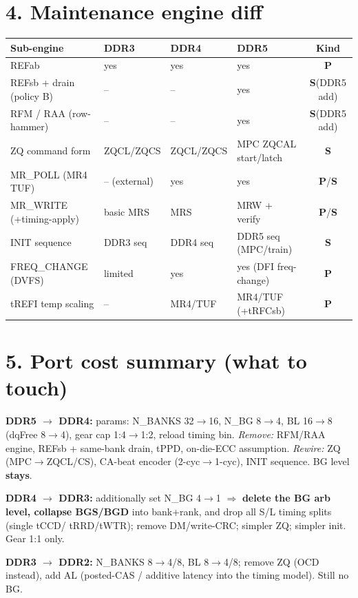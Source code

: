 \documentclass[10pt]{article}
\renewcommand{\P}{\textbf{\textcolor{para}{P}}}
\newcommand{\Su}{\textbf{\textcolor{stru}{S}}}
\begin{document}
\section*{4. Maintenance engine diff}
{\footnotesize
\begin{longtable}{>{\raggedright\arraybackslash}p{3.4cm} p{2.2cm} p{2.2cm} p{2.6cm} c}
\toprule
\textbf{Sub-engine} & \textbf{DDR3} & \textbf{DDR4} & \textbf{DDR5} & \textbf{Kind}\\
\midrule\endhead
REFab              & yes          & yes         & yes           & \P\\
REFsb + drain (policy B) & --     & --          & yes           & \Su (DDR5 add)\\
RFM / RAA (row-hammer) & --       & --          & yes           & \Su (DDR5 add)\\
ZQ command form    & ZQCL/ZQCS    & ZQCL/ZQCS   & MPC ZQCAL start/latch & \Su\\
MR\_POLL (MR4 TUF) & -- (external) & yes        & yes           & \P/\Su\\
MR\_WRITE (+timing-apply) & basic MRS & MRS     & MRW + verify  & \P/\Su\\
INIT sequence      & DDR3 seq     & DDR4 seq    & DDR5 seq (MPC/train) & \Su\\
FREQ\_CHANGE (DVFS) & limited     & yes         & yes (DFI freq-change)  & \P\\
tREFI temp scaling & --           & MR4/TUF     & MR4/TUF (+tRFCsb) & \P\\
\bottomrule
\end{longtable}}

\section*{5. Port cost summary (what to touch)}
\textbf{DDR5 $\rightarrow$ DDR4:} params: N\_BANKS 32$\to$16, N\_BG 8$\to$4, BL 16$\to$8
(dqFree 8$\to$4), gear cap 1:4$\to$1:2, reload timing bin. \emph{Remove:} RFM/RAA engine,
REFsb + same-bank drain, tPPD, on-die-ECC assumption. \emph{Rewire:} ZQ (MPC$\to$ZQCL/CS),
CA-beat encoder (2-cyc$\to$1-cyc), INIT sequence. BG level \textbf{stays}.

\textbf{DDR4 $\rightarrow$ DDR3:} additionally set N\_BG 4$\to$1 $\Rightarrow$ \textbf{delete the
BG arb level, collapse BGS/BGD} into bank+rank, and drop all S/L timing splits (single tCCD/
tRRD/tWTR); remove DM/write-CRC; simpler ZQ; simpler init. Gear 1:1 only.

\textbf{DDR3 $\rightarrow$ DDR2:} N\_BANKS 8$\to$4/8, BL 8$\to$4/8; remove ZQ (OCD instead),
add AL (posted-CAS / additive latency into the timing model). Still no BG.
\end{document}
